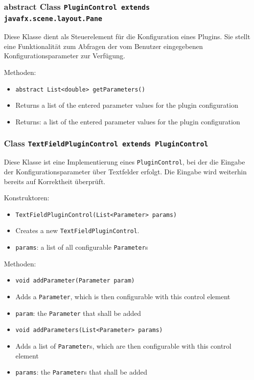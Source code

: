 \documentclass[parskip=full,11pt]{scrartcl}
\begin{document}
\subsubsection{abstract Class \texttt{PluginControl extends javafx.scene.layout.Pane}}

Diese Klasse dient als Steuerelement für die Konfiguration eines Plugins. Sie stellt eine Funktionalität zum Abfragen der vom Benutzer eingegebenen Konfigurationsparameter zur Verfügung.

Methoden:

\begin{itemize}\itemsep -10pt
	\item \texttt{abstract List<double> getParameters()}
	\item[] Returns a list of the entered parameter values for the plugin configuration
	\item[] Returns: a list of the entered parameter values for the plugin configuration
\end{itemize}

\subsubsection{Class \texttt{TextFieldPluginControl extends PluginControl}}

Diese Klasse ist eine Implementierung eines  \texttt{PluginControl}, bei der die Eingabe der Konfigurationsparameter über Textfelder erfolgt. Die Eingabe wird weiterhin bereits auf Korrektheit überprüft.

Konstruktoren:

\begin{itemize}\itemsep -10pt
	\item \texttt{TextFieldPluginControl(List<Parameter> params)}
	\item[] Creates a new \texttt{TextFieldPluginControl}.
	\item[] \texttt{params}: a list of all configurable \texttt{Parameter}s
\end{itemize}

Methoden:

\begin{itemize}\itemsep -10pt
	\item \texttt{void addParameter(Parameter param)}
	\item[] Adds a \texttt{Parameter}, which is then configurable with this control element
	\item[] \texttt{param}: the \texttt{Parameter} that shall be added
	\item \texttt{void addParameters(List<Parameter> params)}
	\item[] Adds a list of \texttt{Parameter}s, which are then configurable with this control element
	\item[] \texttt{params}: the \texttt{Parameter}s that shall be added
\end{itemize}
\end{document}
